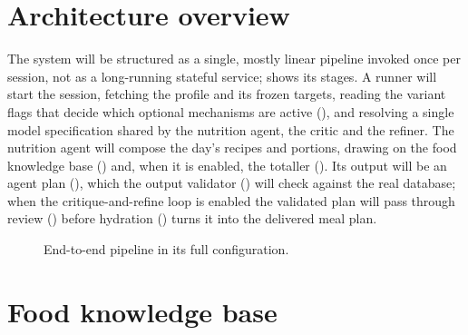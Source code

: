 \section{Architecture overview}
\label{sec:design-pipeline}

The system will be structured as a single, mostly linear pipeline invoked once per session, not as a long-running stateful service;  shows its stages. A runner will start the session, fetching the profile and its frozen targets, reading the variant flags that decide which optional mechanisms are active (), and resolving a single model specification shared by the nutrition agent, the critic and the refiner. The nutrition agent will compose the day's recipes and portions, drawing on the food knowledge base () and, when it is enabled, the totaller (). Its output will be an agent plan (), which the output validator () will check against the real database; when the critique-and-refine loop is enabled the validated plan will pass through review () before hydration () turns it into the delivered meal plan.

\begin{figure}[p]
    \centering
    \resizebox{\textwidth}{!}{}
    \caption{End-to-end pipeline in its full configuration.}
    \label{fig:diagram-pipeline}
\end{figure}

\section{Food knowledge base}
\label{sec:design-food-db}

